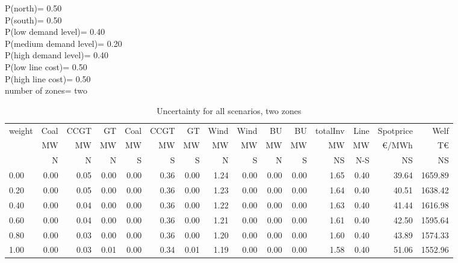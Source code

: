 \documentclass[landscape]{article}
\begin{document}
P(north)=         0.50\\
P(south)=         0.50\\
P(low demand level)=         0.40\\
P(medium demand level)=         0.20\\
P(high demand level)=         0.40\\
P(low line cost)=         0.50\\
P(high line cost)=         0.50\\
number of zones= two\\
\begin{table}[htb]\caption{Uncertainty for all scenarios, two zones}
\begin{tabular}{l|rrrrrr|rr|rr|rr|rr}
\toprule
 weight &    Coal &     CCGT &      GT &   Coal  &   CCGT &      GT &    Wind &    Wind  &  BU  &  BU  & totalInv  &    Line   &  Spotprice   &  Welf   \\
        &      MW &       MW &      MW &      MW &     MW &      MW &      MW &      MW  &  MW  &  MW  &    MW     &    MW     &  \euro/MWh &  T\euro   \\
        &       N &       N  &      N  &      S  &      S &       S &       N &       S  &  N   &  S   &    NS     &    N-S    &  NS      &   NS    \\
\midrule
        0.00&        0.00&        0.05&        0.00&        0.00&        0.36&        0.00&        1.24&        0.00&        0.00&        0.00&        1.65&        0.40&       39.64&     1659.89\\
        0.20&        0.00&        0.05&        0.00&        0.00&        0.36&        0.00&        1.23&        0.00&        0.00&        0.00&        1.64&        0.40&       40.51&     1638.42\\
        0.40&        0.00&        0.04&        0.00&        0.00&        0.36&        0.00&        1.22&        0.00&        0.00&        0.00&        1.63&        0.40&       41.44&     1616.98\\
        0.60&        0.00&        0.04&        0.00&        0.00&        0.36&        0.00&        1.21&        0.00&        0.00&        0.00&        1.61&        0.40&       42.50&     1595.64\\
        0.80&        0.00&        0.03&        0.00&        0.00&        0.36&        0.00&        1.20&        0.00&        0.00&        0.00&        1.60&        0.40&       43.89&     1574.33\\
        1.00&        0.00&        0.03&        0.01&        0.00&        0.34&        0.01&        1.19&        0.00&        0.00&        0.00&        1.58&        0.40&       51.06&     1552.96\\
\bottomrule
\end{tabular}
\end{table}
\end{document}
